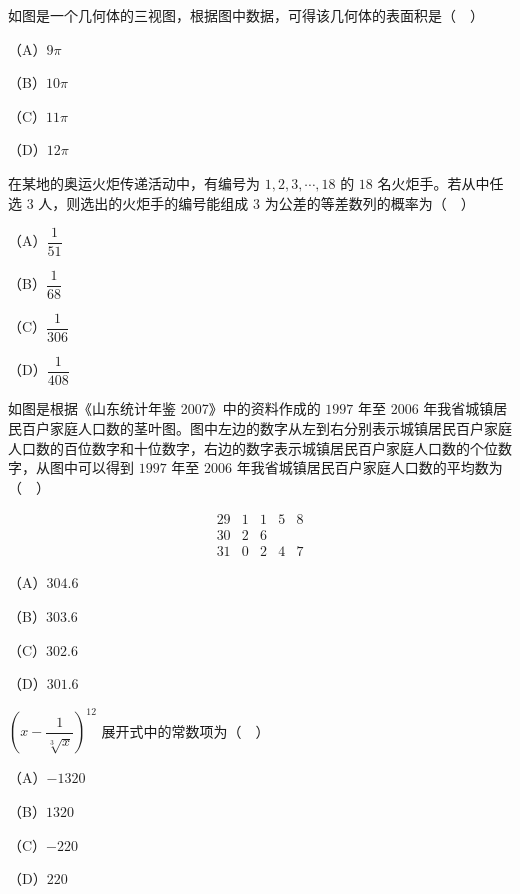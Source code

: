 \begingroup
\renewenvironment{question}{\Needspace{0.5\textheight}}{}
\begin{question}
如图是一个几何体的三视图，根据图中数据，可得该几何体的表面积是（　）
\nopagebreak[4]
\begin{center}\end{center}
\nopagebreak[4]
（A）$9\pi$

（B）$10\pi$

（C）$11\pi$

（D）$12\pi$

\end{question}
\endgroup
\begin{question}
在某地的奥运火炬传递活动中，有编号为 $1,2,3,\cdots,18$ 的 $18$ 名火炬手。若从中任选 $3$ 人，则选出的火炬手的编号能组成 $3$ 为公差的等差数列的概率为（　）

（A）$\dfrac1{51}$

（B）$\dfrac1{68}$

（C）$\dfrac1{306}$

（D）$\dfrac1{408}$

\end{question}
\begingroup
\renewenvironment{question}{\Needspace{0.44\textheight}}{}
\begin{question}
如图是根据《山东统计年鉴 2007》中的资料作成的 $1997$ 年至 $2006$ 年我省城镇居民百户家庭人口数的茎叶图。图中左边的数字从左到右分别表示城镇居民百户家庭人口数的百位数字和十位数字，右边的数字表示城镇居民百户家庭人口数的个位数字，从图中可以得到 $1997$ 年至 $2006$ 年我省城镇居民百户家庭人口数的平均数为（　）

\nopagebreak[4]
\[\begin{array}{c|cccc}
29&1&1&5&8\\
30&2&6&&\\
31&0&2&4&7
\end{array}\]

（A）$304.6$

（B）$303.6$

（C）$302.6$

（D）$301.6$

\end{question}
\endgroup
\begin{question}
$\left(x-\dfrac1{\sqrt[3]x}\right)^{12}$ 展开式中的常数项为（　）

（A）$-1320$

（B）$1320$

（C）$-220$

（D）$220$

\end{question}
